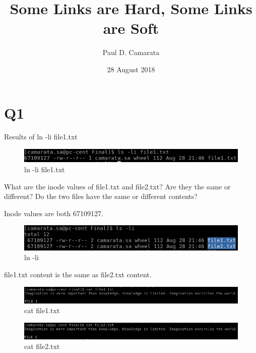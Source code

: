 \documentclass[10pt]{article}
\begin{document}
\title{Some Links are Hard, Some Links are Soft}
\author{Paul D. Camarata}
\date{28 August 2018}

\maketitle
\pagebreak

\section{Q1}
Results of ln -li file1.txt

\begin{figure}[H]
\centering
\includegraphics[scale=0.5]{./images/ss1.png}
\caption{ln -li file1.txt}
\label{ln -li file1.txt}
\end{figure}

What are the inode values of file1.txt and file2.txt?  Are they the same or different? Do the two files have the same or different contents?

Inode values are both 67109127. 

\begin{figure}[H]
\centering
\includegraphics[scale=0.5]{./images/ss2.png}
\caption{ln -li}
\label{ln -li}
\end{figure}

file1.txt content is the same as file2.txt content.

\begin{figure}[H]
\centering
\includegraphics[scale=0.5]{./images/ss3.png}
\caption{cat file1.txt}
\label{cat file1.txt}
\end{figure}

\begin{figure}[H]
\centering
\includegraphics[scale=0.5]{./images/ss4.png}
\caption{cat file2.txt}
\label{cat file2.txt}
\end{figure}
\end{document}
